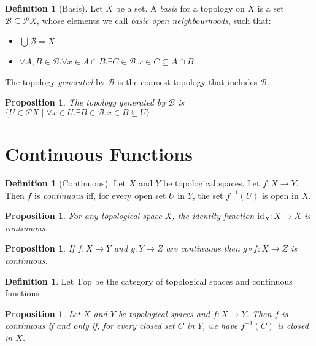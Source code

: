 \documentclass{book}
\newtheorem{prop}[ax]{Proposition}
\theoremstyle{definition}
\newtheorem{df}[ax]{Definition}
\newcommand{\id}[1]{\ensuremath{\mathrm{id}_{#1}}}
\begin{document}
\begin{df}[Basis]
Let $X$ be a set. A \emph{basis} for a topology on $X$ is a set $\mathcal{B} \subseteq \mathcal{P} X$, whose elements we call \emph{basic open neighbourhoods}, such that:
\begin{itemize}
\item $\bigcup \mathcal{B} = X$
\item $\forall A,B \in \mathcal{B}. \forall x \in A \cap B. \exists C \in \mathcal{B}. x \in C \subseteq A \cap B$.
\end{itemize}
The topology \emph{generated} by $\mathcal{B}$ is the coarsest topology that includes $\mathcal{B}$.
\end{df}

\begin{prop}
The topology generated by $\mathcal{B}$ is $\{ U \in \mathcal{P} X \mid \forall x \in U. \exists B \in \mathcal{B}. x \in B \subseteq U \}$
\end{prop}

\section{Continuous Functions}

\begin{df}[Continuous]
Let $X$ and $Y$ be topological spaces. Let $f : X \rightarrow Y$. Then $f$ is \emph{continuous} iff, for every open set $U$ in $Y$, the set $f^{-1}(U)$ is open in $X$.
\end{df}

\begin{prop}
For any topological space $X$, the identity function $\id{X} : X \rightarrow X$ is continuous.
\end{prop}

\begin{prop}
If $f : X \rightarrow Y$ and $g : Y \rightarrow Z$ are continuous then $g \circ f : X \rightarrow Z$ is continuous.
\end{prop}

\begin{df}
Let $\mathrm{Top}$ be the category of topological spaces and continuous functions.
\end{df}

\begin{prop}
Let $X$ and $Y$ be topological spaces and $f : X \rightarrow Y$. Then $f$ is continuous if and only if, for every closed set $C$ in $Y$, we have $f^{-1}(C)$ is closed in $X$.
\end{prop}
\end{document}
